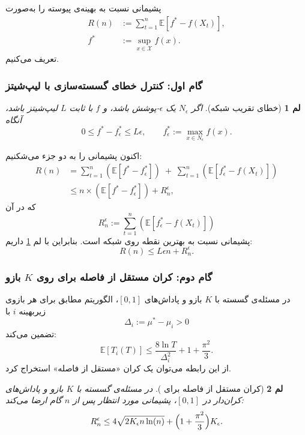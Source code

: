 \documentclass[a4paper,10pt,twocolumn]{article}
\newtheorem{lemma}{لم}
\begin{document}
پشیمانی نسبت به بهینه‌ی پیوسته را به‌صورت
\[
\begin{aligned}
R(n) &:= \sum_{t=1}^n \mathbb{E}\!\left[f^\ast - f(X_t)\right],\\
f^\ast &:= \sup_{x\in\mathcal{X}} f(x).
\end{aligned}
\]
تعریف می‌کنیم.

\subsubsection{گام اول: کنترل خطای گسسته‌سازی با لیپ‌شیتز}
\label{subsec:disc-error}

\begin{lemma}[خطای تقریب شبکه]
\label{lem:approx-net}
اگر $N_\epsilon$ یک $\epsilon$-پوشش باشد، و $f$ با ثابت $L$ لیپ‌شیتز باشد، آنگاه
\[
0 \le f^\ast - f^\ast_\epsilon \le L\epsilon,
\qquad
f^\ast_\epsilon := \max_{x\in N_\epsilon} f(x).
\]
\end{lemma}

اکنون پشیمانی را به دو جزء می‌شکنیم:
\[
\begin{aligned}
R(n) &=\sum_{t=1}^n (\mathbb{E}\!\left[f^\ast-f^\ast_\epsilon\right]) \;+\; \sum_{t=1}^n (\mathbb{E}\!\left[f^\ast_\epsilon-f(X_t)\right]) \\
&\le n \times (\mathbb{E}\!\left[f^\ast-f^\ast_\epsilon\right]) + R_n^\epsilon,
\end{aligned}
\]
که در آن
\[
R_n^\epsilon := \sum_{t=1}^n (\mathbb{E}\!\left[f^\ast_\epsilon - f(X_t)\right])
\]
پشیمانی نسبت به بهترین نقطه روی شبکه است.
بنابراین با لم \ref{lem:approx-net} داریم:
\[
R(n) \le L\epsilon n + R_n^\epsilon.\]

\subsubsection{گام دوم: کران مستقل از فاصله برای  روی $K$ بازو}
\label{subsec:gapfree-ucb1}

در مسئله‌ی گسسته با $K$ بازو و پاداش‌های $[0,1]$، الگوریتم  مطابق \cite{auer2002finite}
برای هر بازوی زیر‌بهینه $i$ با \[\Delta_i:=\mu^\ast-\mu_i>0\] تضمین می‌کند:
\[
\mathbb{E}[T_i(T)]
\le \frac{8\ln T}{\Delta_i^2} + 1 + \frac{\pi^2}{3}.
\tag{$\star$}
\label{eq:ucb1-pulls}
\]
از این رابطه می‌توان یک کران «مستقل از فاصله» استخراج کرد.

\begin{lemma}[کران مستقل از فاصله برای ]
\label{lem:gapfree}
در مسئله‌ی گسسته با $K$ بازو و پاداش‌های کران‌دار در $[0,1]$، پشیمانی مورد انتظار  پس از $n$ گام ارضا می‌کند:
\[
R_n^\epsilon
\le
4\sqrt{2K_\epsilon n\ln (n)}
+
\Bigl(1+\frac{\pi^2}{3}\Bigr)K_\epsilon.
\]
\end{lemma}
\end{document}
